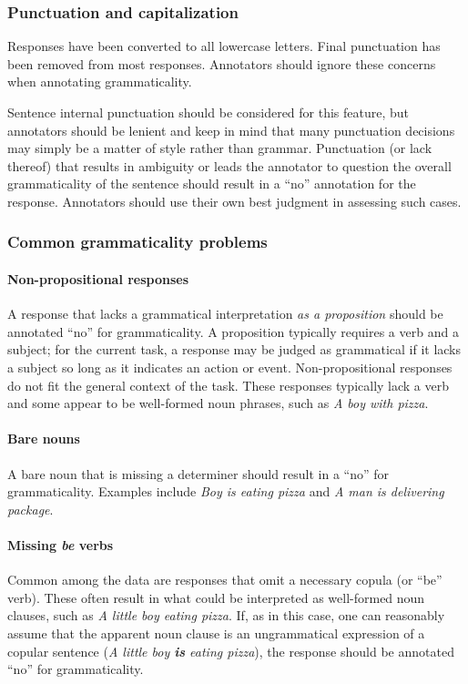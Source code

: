 \documentclass[12pt,notitlepage]{article}
\begin{document}
\subsubsection{Punctuation and capitalization} Responses have been converted to all lowercase letters. Final punctuation has been removed from most responses. Annotators should ignore these concerns when annotating grammaticality. 

Sentence internal punctuation should be considered for this feature, but annotators should be lenient and keep in mind that many punctuation decisions may simply be a matter of style rather than grammar. Punctuation (or lack thereof) that results in ambiguity or leads the annotator to question the overall grammaticality of the sentence should result in a ``no'' annotation for the response. Annotators should use their own best judgment in assessing such cases.

\subsubsection{Common grammaticality problems}

\paragraph{Non-propositional responses} \label{para:non-propositional} A response that lacks a grammatical interpretation \textit{as a proposition} should be annotated ``no'' for grammaticality. A proposition typically requires a verb and a subject; for the current task, a response may be judged as grammatical if it lacks a subject so long as it indicates an action or event. Non-propositional responses do not fit the general context of the task. These responses typically lack a verb and some appear to be well-formed noun phrases, such as \textit{A boy with pizza}.

\paragraph{Bare nouns} A bare noun that is missing a determiner should result in a ``no'' for grammaticality. Examples include \textit{Boy is eating pizza} and \textit{A man is delivering package}.

\paragraph{Missing \textit{be} verbs} Common among the data are responses that omit a necessary copula (or ``be'' verb). These often result in what could be interpreted as well-formed noun clauses, such as \textit{A little boy eating pizza}. If, as in this case, one can reasonably assume that the apparent noun clause is an ungrammatical expression of a copular sentence (\textit{A little boy \textbf{is} eating pizza}), the response should be annotated ``no'' for grammaticality. 
\end{document}
